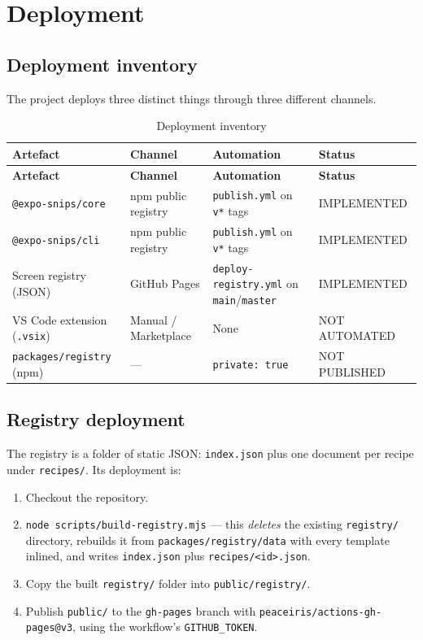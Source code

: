 \chapter{Deployment}
\label{ch:deployment}

\section{Deployment inventory}

The project deploys three distinct things through three different channels.

\begin{longtable}{@{}L{3.6cm}L{3.2cm}L{4.2cm}L{3.2cm}@{}}
\caption{Deployment inventory}\\
\toprule
\textbf{Artefact} & \textbf{Channel} & \textbf{Automation} & \textbf{Status} \\
\midrule
\endfirsthead
\toprule
\textbf{Artefact} & \textbf{Channel} & \textbf{Automation} & \textbf{Status} \\
\midrule
\endhead
\texttt{@expo-snips/core} & npm public registry & \texttt{publish.yml} on \texttt{v*}
tags & IMPLEMENTED \\
\texttt{@expo-snips/cli} & npm public registry & \texttt{publish.yml} on \texttt{v*}
tags & IMPLEMENTED \\
Screen registry (JSON) & GitHub Pages & \texttt{deploy-registry.yml} on
\texttt{main}/\texttt{master} & IMPLEMENTED \\
VS Code extension (\texttt{.vsix}) & Manual / Marketplace & None & NOT AUTOMATED \\
\texttt{packages/registry} (npm) & --- & \texttt{private: true} & NOT PUBLISHED \\
\bottomrule
\end{longtable}

\section{Registry deployment}

The registry is a folder of static JSON: \texttt{index.json} plus one document
per recipe under \texttt{recipes/}. Its deployment is:

\begin{enumerate}
  \item Checkout the repository.
  \item \texttt{node scripts/build-registry.mjs} --- this \emph{deletes} the
        existing \texttt{registry/} directory, rebuilds it from
        \texttt{packages/registry/data} with every template inlined, and writes
        \texttt{index.json} plus \texttt{recipes/<id>.json}.
  \item Copy the built \texttt{registry/} folder into \texttt{public/registry/}.
  \item Publish \texttt{public/} to the \texttt{gh-pages} branch with
        \texttt{peaceiris/actions-gh-pages@v3}, using the workflow's
        \texttt{GITHUB\_TOKEN}.
\end{enumerate}

